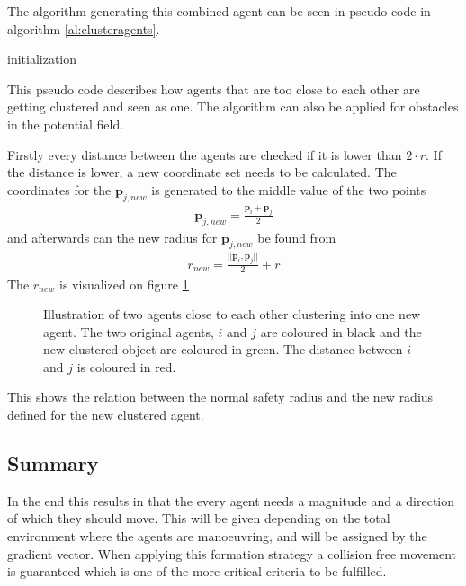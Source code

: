 The algorithm generating this combined agent can be seen in pseudo code in algorithm \ref{al:clusteragents}.
\begin{algorithm}[H]
  initialization\;
  \caption{This pseudo code describes how agents that are too close to each other are getting clustered and seen as one. The algorithm can also be applied for obstacles in the potential field.}
  \label{al:clusteragents}
\end{algorithm}
Firstly every distance between the agents are checked if it is lower than $2 \cdot r$. If the distance is lower, a new coordinate set needs to be calculated. The coordinates for the $\mathbf{p}_{j,new}$ is generated to the middle value of the two points
\begin{align}
\mathbf{p}_{j,new} = \frac{\mathbf{p}_i + \mathbf{p}_j}{2}
\end{align}
and afterwards can the new radius for $\mathbf{p}_{j,new}$ be found from
\begin{align}
r_{new} = \frac{||\mathbf{p}_i , \mathbf{p}_j||}{2} + r
\end{align}
The $r_{new}$ is visualized on figure \ref{fig:rnew}
\begin{figure}[htbp]
\centering

\caption{Illustration of two agents close to each other clustering into one new agent. The two original agents, $i$ and $j$ are coloured in black and the new clustered object are coloured in green. The distance between $i$ and $j$ is coloured in red.}
\label{fig:rnew}
\end{figure}
This shows the relation between the normal safety radius and the new radius defined for the new clustered agent.

\subsection{Summary}
In the end this results in that the every agent needs a magnitude and
a direction of which they should move. This will be given depending on
the total environment where the agents are manoeuvring, and will be assigned by the gradient vector. When applying
this formation strategy a collision free movement is guaranteed which
is one of the more critical criteria to be fulfilled. 

